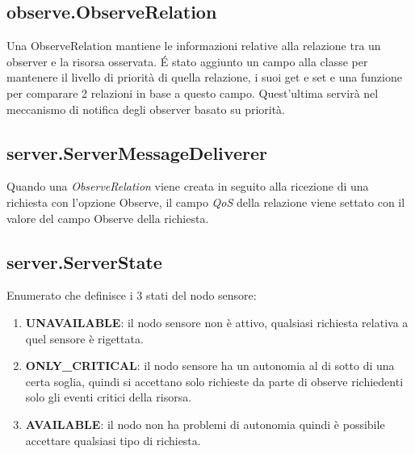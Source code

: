 			\subsection{observe.ObserveRelation}
				Una ObserveRelation mantiene le informazioni relative alla relazione tra un observer e la risorsa osservata. \'E stato aggiunto un 	campo alla classe per mantenere il livello di priorità di quella relazione, i suoi get e set e una funzione per comparare 2 relazioni in base a questo campo. Quest'ultima servirà nel meccanismo di notifica degli observer basato su priorità. \newline
					
					

			\subsection{server.ServerMessageDeliverer}
				Quando una \textit{ObserveRelation} viene creata in seguito alla ricezione di una richiesta con l’opzione Observe, il campo \textit{QoS} della relazione viene settato con il valore del campo Observe della richiesta. \newline
				

			\subsection{server.ServerState}
				Enumerato che definisce i 3 stati del nodo sensore:
				\begin{enumerate}
					\item \textbf{UNAVAILABLE}: il nodo sensore non è attivo, qualsiasi richiesta relativa a quel sensore è rigettata.
					\item \textbf{ONLY\_CRITICAL}: il nodo sensore ha un autonomia al di sotto di una certa soglia, quindi si accettano solo richieste da parte di observe richiedenti solo gli eventi critici della risorsa.
					\item \textbf{AVAILABLE}: il nodo non ha problemi di autonomia quindi è possibile accettare qualsiasi tipo di richiesta.
				\end{enumerate}
				

